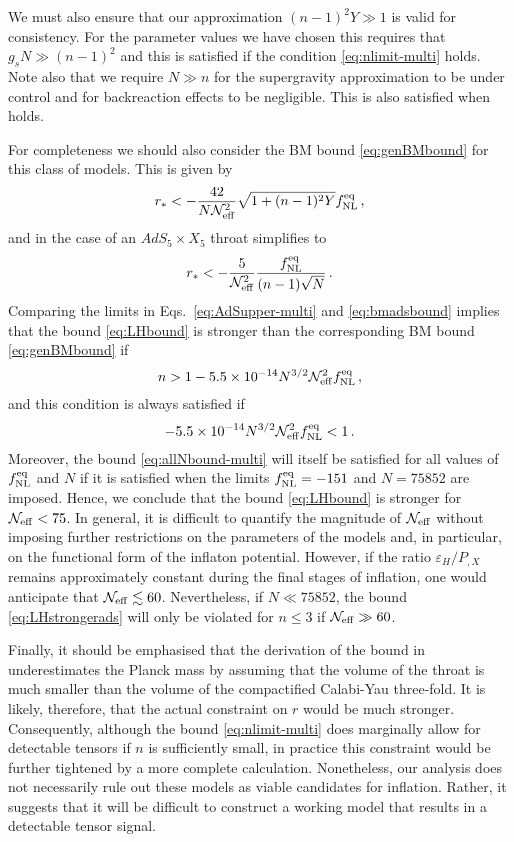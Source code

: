 We must also ensure that our approximation $(n-1)^2Y \gg 1$ 
is valid for consistency.  
For the parameter values we have chosen this requires that 
$g_s N \gg  (n-1)^2$ 
and this is satisfied if the condition \eqref{eq:nlimit-multi} 
holds. Note also that we require $N \gg n$ for the supergravity 
approximation to be under control and for backreaction effects to 
be negligible. This is also satisfied when   
holds. 


For completeness we should also consider the 
BM bound \eqref{eq:genBMbound} for this class of models. This is given by 
% 
\begin{equation}
\label{eq:BMAdS-multi}
r_* < -\frac{42}{N \mathcal{N}_\mathrm{eff}^2}\sqrt{1 +(n-1)^2Y}f_{\mathrm{NL}}^{\mathrm{eq}} \,,
\end{equation}
%  
and in the case of an $AdS_5 \times X_5$ throat simplifies to
%  
\begin{equation}
\label{eq:bmadsbound}
r_* < -\frac{5}{\mathcal{N}_\mathrm{eff}^2} 
\frac{f_{\mathrm{NL}}^{\mathrm{eq}}}{(n-1)\sqrt{N}} \,.
\end{equation}
%  
Comparing the limits in Eqs.~\eqref{eq:AdSupper-multi} and
\eqref{eq:bmadsbound} 
implies that the bound \eqref{eq:LHbound} is stronger than the corresponding BM
bound \eqref{eq:genBMbound} if 
% 
\begin{equation}
\label{eq:LHstrongerads}
n > 1 -5.5 \times 10^{-14} N^{3/2} \mathcal{N}_\mathrm{eff}^2 f_{\mathrm{NL}}^{\mathrm{eq}} \,,
\end{equation}
% 
and this condition is always satisfied if 
% 
\begin{equation}
\label{eq:allNbound-multi}
-5.5 \times 10^{-14} N^{3/2} \mathcal{N}_\mathrm{eff}^2 f_{\mathrm{NL}}^{\mathrm{eq}}  <1  \, .
\end{equation}
% 
Moreover, the bound \eqref{eq:allNbound-multi} will itself be satisfied for 
all values of $f_{\mathrm{NL}}^{\mathrm{eq}}$ and $N$ if it is satisfied when the limits 
$f_{\mathrm{NL}}^{\mathrm{eq}} =-151$ and $N=75852$ are imposed. Hence, we conclude that the bound
\eqref{eq:LHbound} 
is stronger for $\mathcal{N}_\mathrm{eff} < 75$. 
In general, it is difficult to quantify 
the magnitude of $\mathcal{N}_\mathrm{eff}$ without 
imposing further restrictions on the parameters of the models 
and, in particular, on the functional form of the inflaton potential. 
However, if the ratio $\varepsilon_H/P_{,X}$ remains approximately 
constant during the final stages of inflation, one would anticipate that 
$\mathcal{N}_\mathrm{eff} \lesssim 60$. Nevertheless, if $N \ll 75852$, the bound 
\eqref{eq:LHstrongerads} will only be violated for $n \le 3$ if 
$\mathcal{N}_\mathrm{eff} \gg 60$.  


Finally, it should be emphasised that the derivation of the bound in
underestimates the Planck mass by assuming that 
the volume of the throat is much smaller 
than the volume of the compactified Calabi-Yau 
three-fold. It is likely, therefore, 
that the actual constraint on $r$ would be much stronger. Consequently, 
although the bound \eqref{eq:nlimit-multi}  
does marginally allow for detectable tensors if $n$ is sufficiently 
small, in practice this constraint would be further tightened by a more 
complete calculation. Nonetheless, our analysis does not necessarily 
rule out these models as viable candidates for inflation. Rather, it  
suggests that it will be difficult to construct a working model 
that results in a detectable tensor signal.   


